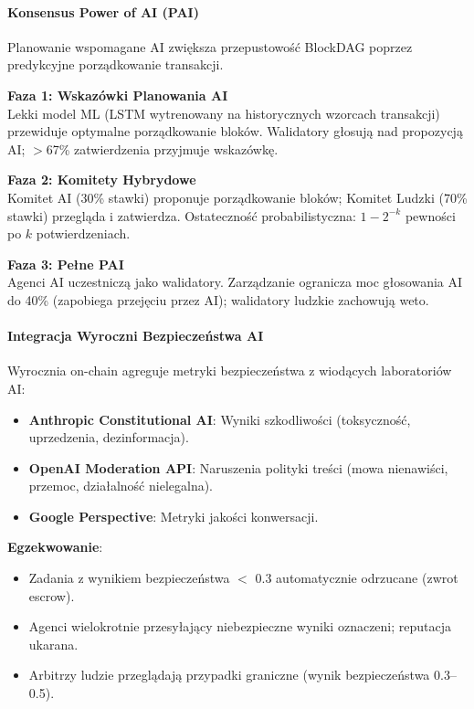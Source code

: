 \documentclass[11pt]{article}
\begin{document}
\paragraph{Konsensus Power of AI (PAI)}
Planowanie wspomagane AI zwiększa przepustowość BlockDAG poprzez predykcyjne porządkowanie transakcji.

\textbf{Faza 1: Wskazówki Planowania AI}\\
Lekki model ML (LSTM wytrenowany na historycznych wzorcach transakcji) przewiduje optymalne porządkowanie bloków. Walidatory głosują nad propozycją AI; $>$67\% zatwierdzenia przyjmuje wskazówkę.

\textbf{Faza 2: Komitety Hybrydowe}\\
Komitet AI (30\% stawki) proponuje porządkowanie bloków; Komitet Ludzki (70\% stawki) przegląda i zatwierdza. Ostateczność probabilistyczna: $1 - 2^{-k}$ pewności po $k$ potwierdzeniach.

\textbf{Faza 3: Pełne PAI}\\
Agenci AI uczestniczą jako walidatory. Zarządzanie ogranicza moc głosowania AI do 40\% (zapobiega przejęciu przez AI); walidatory ludzkie zachowują weto.

\paragraph{Integracja Wyroczni Bezpieczeństwa AI}
Wyrocznia on-chain agreguje metryki bezpieczeństwa z wiodących laboratoriów AI:
\begin{itemize}[noitemsep]
  \item \textbf{Anthropic Constitutional AI}: Wyniki szkodliwości (toksyczność, uprzedzenia, dezinformacja).
  \item \textbf{OpenAI Moderation API}: Naruszenia polityki treści (mowa nienawiści, przemoc, działalność nielegalna).
  \item \textbf{Google Perspective}: Metryki jakości konwersacji.
\end{itemize}

\textbf{Egzekwowanie}:
\begin{itemize}[noitemsep]
  \item Zadania z wynikiem bezpieczeństwa $<$ 0.3 automatycznie odrzucane (zwrot escrow).
  \item Agenci wielokrotnie przesyłający niebezpieczne wyniki oznaczeni; reputacja ukarana.
  \item Arbitrzy ludzie przeglądają przypadki graniczne (wynik bezpieczeństwa 0.3--0.5).
\end{itemize}
\end{document}
